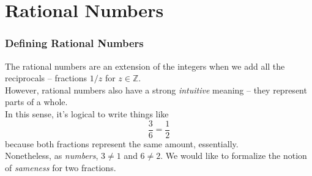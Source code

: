 \documentclass[aspectratio=169,11pt,usenames,dvipsnames]{beamer}
\newcommand{\Z}{\mathbb{Z}}
\begin{document}
\section{Rational Numbers}
\label{sec:rational-numbers}

\begin{frame}
 \frametitle{Def\hspace*{0pt}ining Rational Numbers}
 The rational numbers are an extension of the integers when we add all the
 \alert{reciprocals} -- fractions $1 / z$ for $z \in \Z$.\pause\\
 However, rational numbers also have a strong \emph{intuitive} meaning -- they
 represent \alert{parts of a whole}.\pause\\
 In this sense, it's logical to write things like
 \[
  \frac{3}{6} = \frac{1}{2}
 \]
 because both fractions represent the same amount, essentially.\pause\\
 Nonetheless, as \emph{numbers}, $3 \neq 1$ and $6 \neq 2$. We would like to
 formalize the notion of \emph{sameness} for two fractions.
\end{frame}
\end{document}
